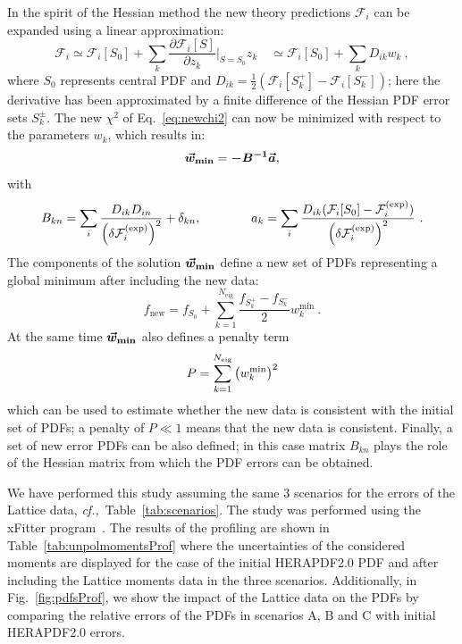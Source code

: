 In the spirit of the Hessian method the new theory predictions $\mathcal{F}_i$ can be expanded
using a linear approximation:
\begin{equation}
\mathcal{F}_i \simeq \mathcal{F}_i[S_0] + \sum_k \frac{\partial\mathcal{F}_i[S]}{\partial z_k}\bigg|_{S=S_0} z_k \quad
              \simeq \mathcal{F}_i[S_0] + \sum_k D_{ik} w_k \ ,
\end{equation}
where $S_0$ represents central PDF and $D_{ik}=\frac{1}{2}(\mathcal{F}_i[S_k^+]-\mathcal{F}_i[S_k^-])$;
here the  derivative has been approximated by a finite difference of the 
Hessian PDF error sets $S_k^{\pm}$.
%
The new $\chi^2$ of Eq.~\eqref{eq:newchi2} can now be minimized with respect to the parameters $w_k$,
which results in:
\begin{equation}
\boldsymbol{\vec{w}_{\text{{\bf min}}}} = \boldsymbol{-B^{-1}} \boldsymbol{\vec{a}},
\end{equation}
with
\begin{equation}
B_{kn} = \sum_i {{D_{ik}D_{in}}\over {\left(\delta\mathcal{F}_i^{\rm(exp)}\right)^2}} + \delta_{kn},
\qquad
\qquad
a_k = \sum_i {{D_{ik}(\mathcal{F}_i[S_0] - \mathcal{F}_i^{\rm(exp)})}\over {\left(\delta\mathcal{F}_i^{\rm(exp)}\right)^2}} \ . 
\end{equation}
%
The components of the solution $\boldsymbol{\vec{w}_{\text{{\bf min}}}}$ define a new set
of PDFs representing a global minimum after including the new data:
\begin{equation}
f_{\text{new}} = f_{S_0} + \sum_{k=1}^{N_{\text{eig}}} \frac{f_{S_k^+}-f_{S_k^-}}{2} w_k^{\text{min}} \ .
\end{equation}
At the same time $\boldsymbol{\vec{w}_{\text{{\bf min}}}}$ also  defines  a penalty term 
\begin{equation}
P = \sum_{k=1}^{N_{\text{eig}}} \left( w_k^{\text{min}} \right)^2
\end{equation}
which can be used to estimate whether the new data is consistent with the initial set of PDFs;
a penalty of $P\ll1$ means that the new data is consistent.
%
Finally, a set of new error PDFs can be also defined; in this case matrix $B_{kn}$ plays the role of
the Hessian matrix from which the PDF errors can be obtained. 




%
We have performed this study assuming the same 3 scenarios for the errors of the Lattice data,
{\it cf.,}~Table~\ref{tab:scenarios}. 
The study was performed using the xFitter program~\cite{Alekhin:2014irh}.
%
The results of the profiling are shown in Table~\ref{tab:unpolmomentsProf} where the uncertainties
of the considered moments are displayed for the case of the initial HERAPDF2.0 PDF and after including the Lattice
moments data in the three scenarios.
%
%
Additionally, in Fig.~\ref{fig:pdfsProf}, we show the impact of the Lattice data on the PDFs by
comparing the relative errors of the PDFs in scenarios A, B and C with initial HERAPDF2.0 errors.

